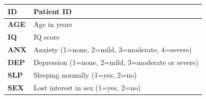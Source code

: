 \documentclass[12pt,a4paper]{book}
\theoremstyle{definition}
\theoremstyle{definition}
\theoremstyle{definition}
\theoremstyle{remark}
\begin{document}
\begin{longtable}[]{@{}ll@{}}
\toprule
\begin{minipage}[b]{0.14\columnwidth}\raggedright
\textbf{ID}\strut
\end{minipage} & \begin{minipage}[b]{0.69\columnwidth}\raggedright
Patient ID\strut
\end{minipage}\tabularnewline
\midrule
\endhead
\begin{minipage}[t]{0.14\columnwidth}\raggedright
\textbf{AGE}\strut
\end{minipage} & \begin{minipage}[t]{0.69\columnwidth}\raggedright
Age in years\strut
\end{minipage}\tabularnewline
\begin{minipage}[t]{0.14\columnwidth}\raggedright
\textbf{IQ}\strut
\end{minipage} & \begin{minipage}[t]{0.69\columnwidth}\raggedright
IQ score\strut
\end{minipage}\tabularnewline
\begin{minipage}[t]{0.14\columnwidth}\raggedright
\textbf{ANX}\strut
\end{minipage} & \begin{minipage}[t]{0.69\columnwidth}\raggedright
Anxiety (1=none, 2=mild, 3=moderate, 4=severe)\strut
\end{minipage}\tabularnewline
\begin{minipage}[t]{0.14\columnwidth}\raggedright
\textbf{DEP}\strut
\end{minipage} & \begin{minipage}[t]{0.69\columnwidth}\raggedright
Depression (1=none, 2=mild, 3=moderate or severe)\strut
\end{minipage}\tabularnewline
\begin{minipage}[t]{0.14\columnwidth}\raggedright
\textbf{SLP}\strut
\end{minipage} & \begin{minipage}[t]{0.69\columnwidth}\raggedright
Sleeping normally (1=yes, 2=no)\strut
\end{minipage}\tabularnewline
\begin{minipage}[t]{0.14\columnwidth}\raggedright
\textbf{SEX}\strut
\end{minipage} & \begin{minipage}[t]{0.69\columnwidth}\raggedright
Lost interest in sex (1=yes, 2=no)\strut
\end{minipage}\tabularnewline

\end{longtable}
\end{document}
